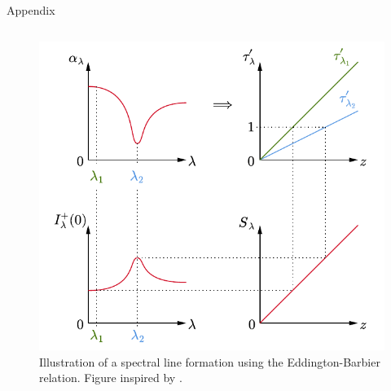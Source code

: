 \documentclass{beamer}
\begin{document}
\begin{frame}[allowframebreaks]{Appendix}
\begin{columns}
		\begin{column}{0.55\textwidth}
			\begin{figure}[h]
				\centering
				\includegraphics[width=\textwidth]{figures/thesis/spectrallineformation.pdf}
				\caption{Illustration of a spectral line formation using the Eddington-Barbier relation. Figure inspired by \cite[p.38]{Rutten.2015}.}
				\label{fig:spectrallineformation}
			\end{figure}
		\end{column}
	\end{columns}
\end{frame}
\end{document}
